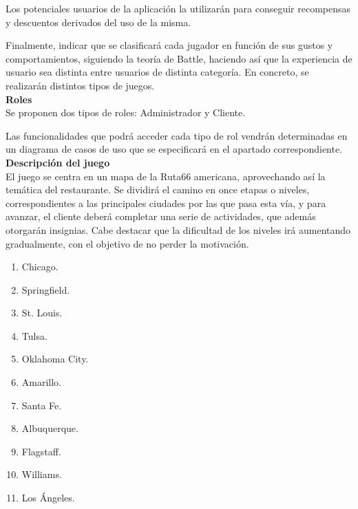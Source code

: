 \documentclass[twoside]{report}
\begin{document}
Los potenciales usuarios de la aplicación la utilizarán para conseguir recompensas y descuentos derivados del uso de la misma.

Finalmente, indicar que se clasificará cada jugador en función de sus gustos y comportamientos, siguiendo la teoría de Battle, haciendo así que la experiencia de usuario sea distinta entre usuarios de distinta categoría. En concreto, se realizarán distintos tipos de juegos.\\

\textbf{Roles}\\

Se proponen dos tipos de roles: Administrador y Cliente.

Las funcionalidades que podrá acceder cada tipo de rol vendrán determinadas en un diagrama de casos de uso que se especificará en el apartado correspondiente. \\

\textbf{Descripción del juego}\\

El juego se centra en un mapa de la Ruta66 americana, aprovechando así la temática del restaurante. Se dividirá el camino en once etapas o niveles, correspondientes a las principales ciudades por las que pasa esta vía, y para avanzar, el cliente deberá completar una serie de actividades, que además otorgarán insignias. Cabe destacar que la dificultad de los niveles irá aumentando gradualmente, con el objetivo de no perder la motivación.

\begin{multicols}{4}
\begin{enumerate}
\item Chicago.
\item Springfield.
\item St. Louis.
\item Tulsa.
\item Oklahoma City.
\item Amarillo.
\item Santa Fe.
\item Albuquerque.
\item Flagstaff.
\item Williams.
\item Los Ángeles.
\end{enumerate}
\end{multicols}
\end{document}

